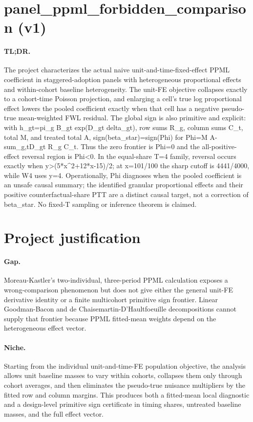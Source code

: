 \documentclass{article}
\begin{document}
\section*{panel_ppml_forbidden_comparison (v1)}

\paragraph{TL;DR.} The project characterizes the actual naive unit-and-time-fixed-effect PPML coefficient in staggered-adoption panels with heterogeneous proportional effects and within-cohort baseline heterogeneity. The unit-FE objective collapses exactly to a cohort-time Poisson projection, and enlarging a cell's true log proportional effect lowers the pooled coefficient exactly when that cell has a negative pseudo-true mean-weighted FWL residual. The global sign is also primitive and explicit: with h_gt=pi_g B_gt exp(D_gt delta_gt), row sums R_g, column sums C_t, total M, and treated total A, sign(beta_star)=sign(Phi) for Phi=M A-sum_{g,t}D_gt R_g C_t. Thus the zero frontier is Phi=0 and the all-positive-effect reversal region is Phi<0. In the equal-share T=4 family, reversal occurs exactly when y>(5*x^2+12*x-15)/2; at x=101/100 the sharp cutoff is 4441/4000, while W4 uses y=4. Operationally, Phi diagnoses when the pooled coefficient is an unsafe causal summary; the identified granular proportional effects and their positive counterfactual-share PTT are a distinct causal target, not a correction of beta_star. No fixed-T sampling or inference theorem is claimed.

\section{Project justification}

\paragraph{Gap.} Moreau-Kastler's two-individual, three-period PPML calculation exposes a wrong-comparison phenomenon but does not give either the general unit-FE derivative identity or a finite multicohort primitive sign frontier. Linear Goodman-Bacon and de Chaisemartin-D'Haultfoeuille decompositions cannot supply that frontier because PPML fitted-mean weights depend on the heterogeneous effect vector.

\paragraph{Niche.} Starting from the individual unit-and-time-FE population objective, the analysis allows unit baseline masses to vary within cohorts, collapses them only through cohort averages, and then eliminates the pseudo-true nuisance multipliers by the fitted row and column margins. This produces both a fitted-mean local diagnostic and a design-level primitive sign certificate in timing shares, untreated baseline masses, and the full effect vector.
\end{document}
